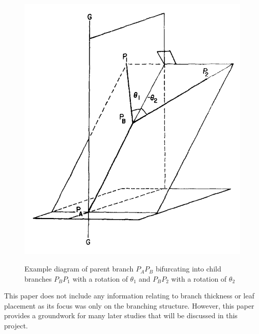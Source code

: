 \documentclass[final]{cmpreport}
\begin{document}
\begin{figure}[h]
    \caption{Example diagram of parent branch $P_AP_B$ bifurcating into child branches
    $P_BP_1$ with a rotation of $\theta_1$ and $P_BP_2$ with a rotation of \textminus$\theta_2$}
    \includegraphics[scale=0.5]{honda-bifurcation.PNG}
    \label{fig:honda-bifurcation}
    \centering
\end{figure}

This paper does not include any information relating to branch thickness or leaf 
placement as its focus was only on the branching structure. However, this paper 
provides a groundwork for many later studies that will be discussed in this project.




\end{document}
